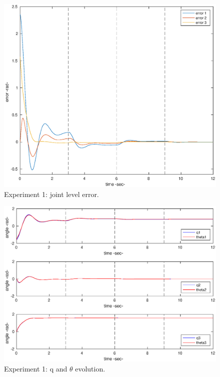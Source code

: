 \begin{figure}[h!]
\centerline{\includegraphics[scale=0.42]{figures/1_1_error.eps}}
\caption{\label{1_1err}
Experiment 1: joint level error.}
\end{figure}

\begin{figure}[h!]
\centerline{\includegraphics[scale=0.42]{figures/1_1_qtheta.eps}}
\caption{\label{1_1qt}
Experiment 1: q and \(\theta\) evolution.}
\end{figure}


